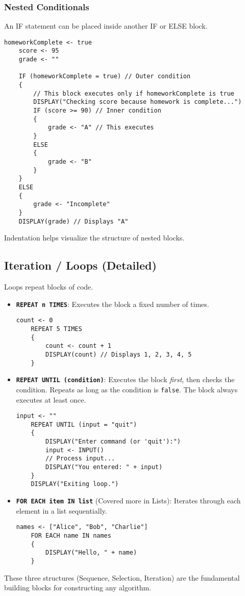 \documentclass[11pt,oneside]{book}
\begin{document}
\subsubsection*{Nested Conditionals}
An IF statement can be placed inside another IF or ELSE block.
\begin{lstlisting}[language={}, label={lst:nested_if}, caption={AP Pseudocode: Nested IFs}]
    homeworkComplete <- true
    score <- 95
    grade <- ""

    IF (homeworkComplete = true) // Outer condition
    {
        // This block executes only if homeworkComplete is true
        DISPLAY("Checking score because homework is complete...")
        IF (score >= 90) // Inner condition
        {
            grade <- "A" // This executes
        }
        ELSE
        {
            grade <- "B"
        }
    }
    ELSE
    {
        grade <- "Incomplete"
    }
    DISPLAY(grade) // Displays "A"
\end{lstlisting}
Indentation helps visualize the structure of nested blocks.

\subsection*{Iteration / Loops (Detailed)}
Loops repeat blocks of code.
\begin{itemize}
    \item \textbf{\texttt{REPEAT n TIMES}}: Executes the block a fixed number of times.\\[1ex]
    \begin{lstlisting}[language={}, label={lst:repeat_n_detail}, caption={AP Pseudocode: REPEAT n TIMES}]
    count <- 0
    REPEAT 5 TIMES
    {
        count <- count + 1
        DISPLAY(count) // Displays 1, 2, 3, 4, 5
    }
    \end{lstlisting}
    \item \textbf{\texttt{REPEAT UNTIL (condition)}}: Executes the block \textit{first}, then checks the condition. Repeats as long as the condition is \texttt{false}. The block always executes at least once.\\[1ex]
    \begin{lstlisting}[language={}, label={lst:repeat_until_detail}, caption={AP Pseudocode: REPEAT UNTIL}]
    input <- ""
    REPEAT UNTIL (input = "quit")
    {
        DISPLAY("Enter command (or 'quit'):")
        input <- INPUT()
        // Process input...
        DISPLAY("You entered: " + input)
    }
    DISPLAY("Exiting loop.")
    \end{lstlisting}
    \item \textbf{\texttt{FOR EACH item IN list}} (Covered more in Lists): Iterates through each element in a list sequentially.\\[1ex]
    \begin{lstlisting}[language={}, label={lst:for_each_detail}, caption={AP Pseudocode: FOR EACH}]
    names <- ["Alice", "Bob", "Charlie"]
    FOR EACH name IN names
    {
        DISPLAY("Hello, " + name)
    }
    \end{lstlisting}
\end{itemize}
These three structures (Sequence, Selection, Iteration) are the fundamental building blocks for constructing any algorithm.
\end{document}
